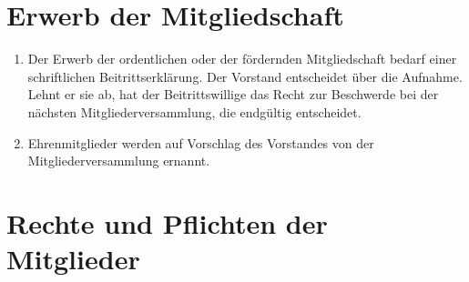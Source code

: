 \documentclass[11pt]{article}
\begin{document}
\section{Erwerb der Mitgliedschaft}
\begin{enumerate}[label=\arabic*)]
	\item Der Erwerb der ordentlichen oder der fördernden Mitgliedschaft bedarf einer schriftlichen Beitrittserklärung. Der Vorstand entscheidet über die Aufnahme. Lehnt er sie ab, hat der Beitrittswillige das Recht zur Beschwerde bei der nächsten Mitgliederversammlung, die endgültig entscheidet.
	\item Ehrenmitglieder werden auf Vorschlag des Vorstandes von der Mitgliederversammlung ernannt.
\end{enumerate}

\section{Rechte und Pflichten der Mitglieder}
\end{document}
